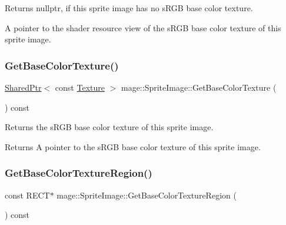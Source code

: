 \begin{DoxyReturn}{Returns}
{\ttfamily nullptr}, if this sprite image has no s\+R\+GB base color texture. 

A pointer to the shader resource view of the s\+R\+GB base color texture of this sprite image. 
\end{DoxyReturn}
\hypertarget{classmage_1_1_sprite_image_a7fa3f86018f033288c755a665ee90bc2}{}\label{classmage_1_1_sprite_image_a7fa3f86018f033288c755a665ee90bc2} 
\subsubsection{\texorpdfstring{Get\+Base\+Color\+Texture()}{GetBaseColorTexture()}}
{\footnotesize\ttfamily \hyperlink{namespacemage_a1e01ae66713838a7a67d30e44c67703e}{Shared\+Ptr}$<$ const \hyperlink{classmage_1_1_texture}{Texture} $>$ mage\+::\+Sprite\+Image\+::\+Get\+Base\+Color\+Texture (\begin{DoxyParamCaption}{ }\end{DoxyParamCaption}) const\hspace{0.3cm}{\ttfamily [noexcept]}}

Returns the s\+R\+GB base color texture of this sprite image.

\begin{DoxyReturn}{Returns}
A pointer to the s\+R\+GB base color texture of this sprite image. 
\end{DoxyReturn}
\hypertarget{classmage_1_1_sprite_image_afd401746e4466bf7849acb373675527c}{}\label{classmage_1_1_sprite_image_afd401746e4466bf7849acb373675527c} 
\subsubsection{\texorpdfstring{Get\+Base\+Color\+Texture\+Region()}{GetBaseColorTextureRegion()}}
{\footnotesize\ttfamily const R\+E\+CT$\ast$ mage\+::\+Sprite\+Image\+::\+Get\+Base\+Color\+Texture\+Region (\begin{DoxyParamCaption}{ }\end{DoxyParamCaption}) const\hspace{0.3cm}{\ttfamily [noexcept]}}

